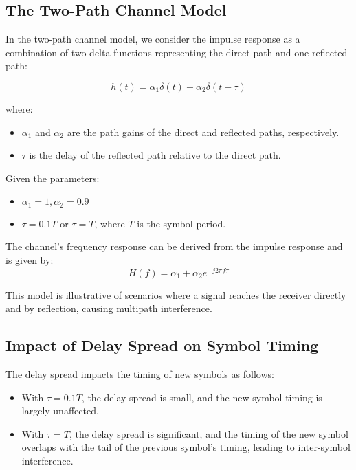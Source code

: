 \subsection*{The Two-Path Channel Model}

In the two-path channel model, we consider the impulse response as a combination of two delta functions representing the direct path and one reflected path:

\begin{equation}
    h(t) = \alpha_1 \delta(t) + \alpha_2 \delta(t - \tau)
\end{equation}

where:
\begin{itemize}
    \item \( \alpha_1 \) and \( \alpha_2 \) are the path gains of the direct and reflected paths, respectively.
    \item \( \tau \) is the delay of the reflected path relative to the direct path.
\end{itemize}

Given the parameters:
\begin{itemize}
    \item \( \alpha_1 = 1, \alpha_2 = 0.9 \)
    \item \( \tau = 0.1T \) or \( \tau = T \), where \( T \) is the symbol period.
\end{itemize}

The channel's frequency response can be derived from the impulse response and is given by:
\begin{equation}
    H(f) = \alpha_1 + \alpha_2 e^{-j2\pi f\tau}
\end{equation}

This model is illustrative of scenarios where a signal reaches the receiver directly and by reflection, causing multipath interference.
\subsection*{Impact of Delay Spread on Symbol Timing}

The delay spread impacts the timing of new symbols as follows:
\begin{itemize}
    \item With \( \tau = 0.1T \), the delay spread is small, and the new symbol timing is largely unaffected.
    \item With \( \tau = T \), the delay spread is significant, and the timing of the new symbol overlaps with the tail of the previous symbol's timing, leading to inter-symbol interference.
\end{itemize}

